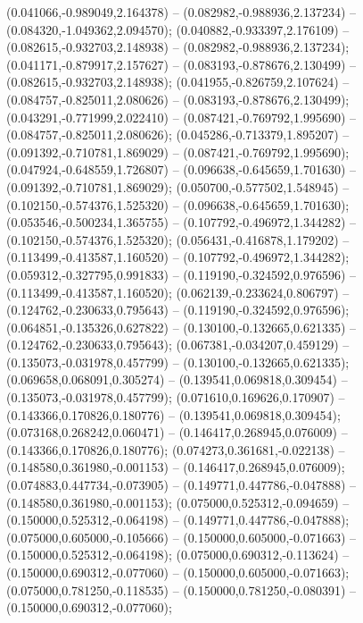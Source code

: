  (0.041066,-0.989049,2.164378) -- (0.082982,-0.988936,2.137234) -- (0.084320,-1.049362,2.094570);
 (0.040882,-0.933397,2.176109) -- (0.082615,-0.932703,2.148938) -- (0.082982,-0.988936,2.137234);
 (0.041171,-0.879917,2.157627) -- (0.083193,-0.878676,2.130499) -- (0.082615,-0.932703,2.148938);
 (0.041955,-0.826759,2.107624) -- (0.084757,-0.825011,2.080626) -- (0.083193,-0.878676,2.130499);
 (0.043291,-0.771999,2.022410) -- (0.087421,-0.769792,1.995690) -- (0.084757,-0.825011,2.080626);
 (0.045286,-0.713379,1.895207) -- (0.091392,-0.710781,1.869029) -- (0.087421,-0.769792,1.995690);
 (0.047924,-0.648559,1.726807) -- (0.096638,-0.645659,1.701630) -- (0.091392,-0.710781,1.869029);
 (0.050700,-0.577502,1.548945) -- (0.102150,-0.574376,1.525320) -- (0.096638,-0.645659,1.701630);
 (0.053546,-0.500234,1.365755) -- (0.107792,-0.496972,1.344282) -- (0.102150,-0.574376,1.525320);
 (0.056431,-0.416878,1.179202) -- (0.113499,-0.413587,1.160520) -- (0.107792,-0.496972,1.344282);
 (0.059312,-0.327795,0.991833) -- (0.119190,-0.324592,0.976596) -- (0.113499,-0.413587,1.160520);
 (0.062139,-0.233624,0.806797) -- (0.124762,-0.230633,0.795643) -- (0.119190,-0.324592,0.976596);
 (0.064851,-0.135326,0.627822) -- (0.130100,-0.132665,0.621335) -- (0.124762,-0.230633,0.795643);
 (0.067381,-0.034207,0.459129) -- (0.135073,-0.031978,0.457799) -- (0.130100,-0.132665,0.621335);
 (0.069658,0.068091,0.305274) -- (0.139541,0.069818,0.309454) -- (0.135073,-0.031978,0.457799);
 (0.071610,0.169626,0.170907) -- (0.143366,0.170826,0.180776) -- (0.139541,0.069818,0.309454);
 (0.073168,0.268242,0.060471) -- (0.146417,0.268945,0.076009) -- (0.143366,0.170826,0.180776);
 (0.074273,0.361681,-0.022138) -- (0.148580,0.361980,-0.001153) -- (0.146417,0.268945,0.076009);
 (0.074883,0.447734,-0.073905) -- (0.149771,0.447786,-0.047888) -- (0.148580,0.361980,-0.001153);
 (0.075000,0.525312,-0.094659) -- (0.150000,0.525312,-0.064198) -- (0.149771,0.447786,-0.047888);
 (0.075000,0.605000,-0.105666) -- (0.150000,0.605000,-0.071663) -- (0.150000,0.525312,-0.064198);
 (0.075000,0.690312,-0.113624) -- (0.150000,0.690312,-0.077060) -- (0.150000,0.605000,-0.071663);
 (0.075000,0.781250,-0.118535) -- (0.150000,0.781250,-0.080391) -- (0.150000,0.690312,-0.077060);
